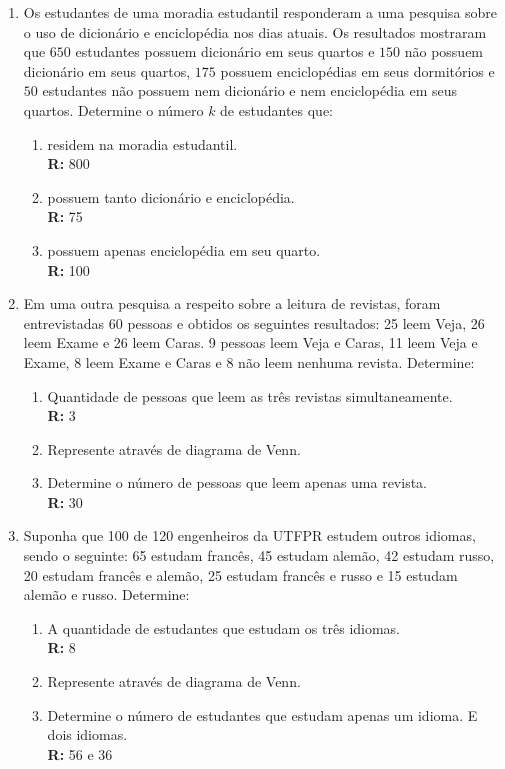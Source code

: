 \documentclass[oneside,a4paper,12pt]{article}
\begin{document}
\begin{enumerate}
	\item Os estudantes de uma moradia estudantil responderam a uma pesquisa sobre o uso de dicionário e enciclopédia nos dias atuais. Os resultados mostraram que $650$ estudantes possuem dicionário em seus quartos e $150$ não possuem dicionário em seus quartos, $175$ possuem enciclopédias em seus dormitórios e $50$ estudantes não possuem nem dicionário e nem enciclopédia em seus quartos. Determine o número $k$ de estudantes que:
	\begin{enumerate}
		\item residem na moradia estudantil. \\ {\bf R:} 800
		\item possuem tanto dicionário e enciclopédia. \\ {\bf R:} 75
		\item possuem apenas enciclopédia em seu quarto. \\ {\bf R:} 100
	\end{enumerate}

	\item Em uma outra pesquisa a respeito sobre a leitura de revistas, foram entrevistadas 60 pessoas e obtidos os seguintes resultados: 25 leem Veja, 26 leem Exame e 26 leem Caras. 9 pessoas leem Veja e Caras, 11 leem Veja e Exame, 8 leem Exame e Caras e 8 não leem nenhuma revista. Determine:
	\begin{enumerate}
		\item Quantidade de pessoas que leem as três revistas simultaneamente. \\ {\bf R:} 3
		\item Represente através de diagrama de Venn.
		\item Determine o número de pessoas que leem apenas uma revista. \\ {\bf R:} 30
	\end{enumerate}
	
	\item Suponha que 100 de 120 engenheiros da UTFPR estudem outros idiomas, sendo o seguinte: 65 estudam francês, 45 estudam alemão, 42 estudam russo, 20 estudam francês e alemão, 25 estudam francês e russo e 15 estudam alemão e russo. Determine:
	\begin{enumerate}
		\item A quantidade de estudantes que estudam os três idiomas. \\ {\bf R:} 8
		\item Represente através de diagrama de Venn.
		\item Determine o número de estudantes que estudam apenas um idioma. E dois idiomas. \\ {\bf R: }56 e 36
	\end{enumerate}


\end{enumerate}
\end{document}
